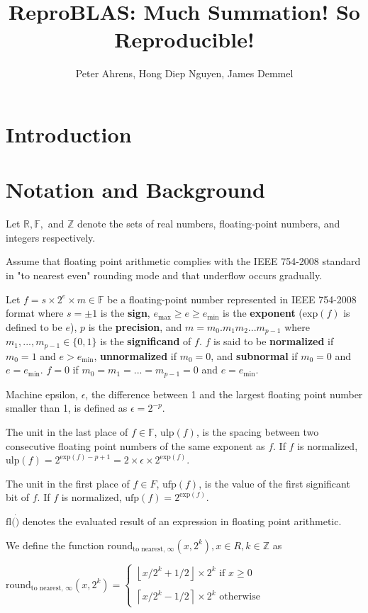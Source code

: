 \documentclass[12pt]{article}
\author{Peter Ahrens, Hong Diep Nguyen, James Demmel}
\title{ReproBLAS: Much Summation! So Reproducible!}
\providecommand{\ceil}[1]{\left \lceil #1 \right \rceil }
\providecommand{\floor}[1]{\left \lfloor #1 \right \rfloor }
\providecommand{\R}{\ensuremath{\mathbb{R}}}
\providecommand{\F}{\ensuremath{\mathbb{F}}}
\providecommand{\Z}{\ensuremath{\mathbb{Z}}}
\providecommand{\exp}{\ensuremath{\text{exp}}}
\providecommand{\min}{\ensuremath{\text{min}}}
\providecommand{\max}{\ensuremath{\text{max}}}
\providecommand{\ulp}{\ensuremath{\text{ulp}}}
\providecommand{\ufp}{\ensuremath{\text{ufp}}}
\providecommand{\fl}{\ensuremath{\text{fl}}}
\providecommand{\roundtonearestinfty}{\ensuremath{\text{round}_\text{to nearest, $\infty$}}}
\theoremstyle{plain}
\begin{document}
\noindent
\maketitle
\tableofcontents
\newpage
\section{Introduction}

\section{Notation and Background}
  Let $\R, \F, $ and $\Z$ denote the sets of real numbers, floating-point numbers, and integers respectively.

  Assume that floating point arithmetic complies with the IEEE 754-2008 standard \cite{ieee754} in "to nearest even" rounding mode and that underflow occurs gradually.

  Let $f = s \times 2^e \times m \in \F$ be a floating-point number represented in IEEE 754-2008 format \cite{ieee754} where $s = \pm 1$ is the \textbf{sign}, $e_{\max} \geq e \geq e_{\min}$ is the \textbf{exponent} ($\exp(f)$ is defined to be $e$), $p$ is the \textbf{precision}, and $m = m_0.m_1m_2...m_{p-1}$ where $m_1, ..., m_{p - 1} \in \{0, 1\}$ is the \textbf{significand} of $f$. $f$ is said to be \textbf{normalized} if $m_0 = 1$ and $e > e_{\min}$, \textbf{unnormalized} if $m_0 = 0$, and \textbf{subnormal} if $m_0 = 0$ and $e = e_{\min}$. $f = 0$ if $m_0 = m_1 = ... = m_{p - 1} = 0$ and $e = e_{\min}$.

  Machine epsilon, $\epsilon$, the difference between 1 and the largest floating point number smaller than 1, is defined as $\epsilon = 2^{-p}$.

  The unit in the last place of $f \in \F$, $\ulp(f)$, is the spacing between two consecutive floating point numbers of the same exponent as $f$. If $f$ is normalized, $\ulp(f) = 2^{\exp(f) - p + 1} = 2 \times \epsilon \times 2^{\exp(f)}$.

  The unit in the first place of $f \in F$, $\ufp(f)$, is the value of the first significant bit of $f$. If $f$ is normalized, $\ufp(f) = 2^{\exp(f)}$.

  $\fl(\dot)$ denotes the evaluated result of an expression in floating point arithmetic.

  We define the function $\roundtonearestinfty(x, 2^k), x \in R, k \in \Z$ as

  $\roundtonearestinfty(x, 2^k) = \begin{cases}\floor{x/2^k + 1/2} \times 2^k \text{ if } x \geq 0\\ \\ \ceil{x/2^k - 1/2}\times 2^k \text{ otherwise}\end{cases}$
\end{document}
